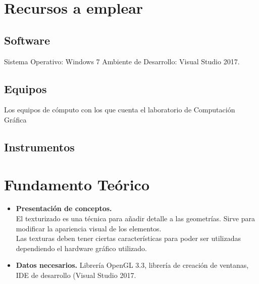\documentclass[11pt, english]{article}
\begin{document}
\section{Recursos a emplear}
\subsection{Software}
Sistema Operativo: Windows 7
Ambiente de Desarrollo: Visual Studio 2017.
\subsection{Equipos}
Los equipos de cómputo con los que cuenta el laboratorio de Computación Gráfica
\subsection{Instrumentos}
\section{Fundamento Teórico}
\begin{itemize}
\item \textbf{Presentación de conceptos.} \\
El texturizado es una técnica para añadir detalle a las geometrías. Sirve para modificar
la apariencia visual de los elementos.
\\
Las texturas deben tener ciertas características para poder ser utilizadas dependiendo
el hardware gráfico utilizado.
\item \textbf{Datos necesarios.}
Librería OpenGL 3.3, librería de creación de ventanas, IDE de desarrollo (Visual Studio 2017.
\end{itemize}
\end{document}
